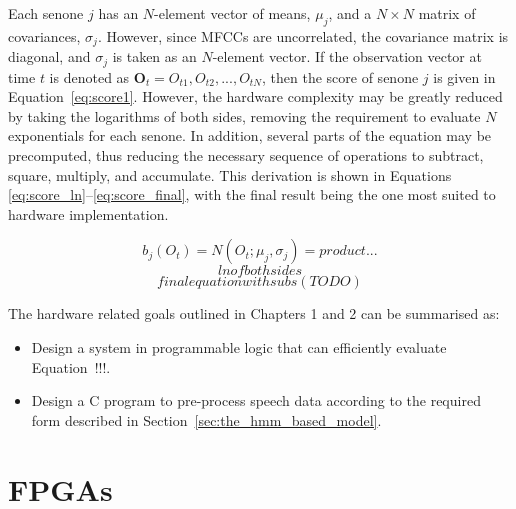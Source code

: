 	Each senone $j$ has an $N$-element vector of means, $\mu_j$, and a $N\times N$ matrix of covariances, $\sigma_j$.  However, since MFCCs are uncorrelated, the covariance matrix is diagonal, and $\sigma_j$ is taken as an $N$-element vector.  If the observation vector at time $t$ is denoted as $\mathbf{O}_t = {O_{t1}, O_{t2}, ..., O_{tN}}$, then the score of senone $j$ is given in Equation~\ref{eq:score1}.  However, the hardware complexity may be greatly reduced by taking the logarithms of both sides, removing the requirement to evaluate $N$ exponentials for each senone.  In addition, several parts of the equation may be precomputed, thus reducing the necessary sequence of operations to subtract, square, multiply, and accumulate.  This derivation is shown in Equations \ref{eq:score_ln}--\ref{eq:score_final}, with the final result being the one most suited to hardware implementation.

	\begin{equation}
	\label{eq:score1}
		b_j(O_t) = N(O_t; \mu_j,\sigma_j) = product...
	\end{equation}
	\begin{equation}
	\label{eq:score_ln}
		ln of both sides
	\end{equation}
	\begin{equation}
	\label{eq:score_final}
		final equation with subs (TODO)
	\end{equation}

	The hardware related goals outlined in Chapters 1 and 2 can be summarised as:
	\begin{itemize}
		\item Design a system in programmable logic that can efficiently evaluate Equation~!!!.
		\item Design a C program to pre-process speech data according to the required form described in Section~\ref{sec:the_hmm_based_model}.
	\end{itemize}


\section{FPGAs} %
\label{sec:fpgas}
	


